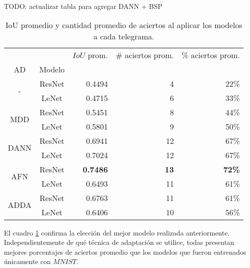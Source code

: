 TODO: actualizar tabla para agregar DANN + BSP
\begin{table}[H]
    \centering
    \begin{tabular}{cc|rrr}
        \toprule
                                 &        & $IoU$ prom.     & \# aciertos prom. & \% aciertos prom. \\
        AD                       & Modelo &                 &                   &                   \\
        \midrule
        \multirow[c]{2}{*}{-}    & ResNet & 0.4494          & 4                 & 22\%              \\
                                 & LeNet  & 0.4715          & 6                 & 33\%              \\\hline
        \multirow[c]{2}{*}{MDD}  & ResNet & 0.5451          & 8                 & 44\%              \\
                                 & LeNet  & 0.5801          & 9                 & 50\%              \\\hline
        \multirow[c]{2}{*}{DANN} & ResNet & 0.6941          & 12                & 67\%              \\
                                 & LeNet  & 0.7024          & 12                & 67\%              \\\hline
        \multirow[c]{2}{*}{AFN}  & ResNet & \textbf{0.7486} & \textbf{13}       & \textbf{72\%}     \\
                                 & LeNet  & 0.6493          & 11                & 61\%              \\\hline
        \multirow[c]{2}{*}{ADDA} & ResNet & 0.6763          & 11                & 61\%              \\
                                 & LeNet  & 0.6406          & 10                & 56\%              \\
        \bottomrule
    \end{tabular}
    \caption{IoU promedio y cantidad promedio de aciertos al aplicar los modelos a cada telegrama.}
    \label{tab:iou-cant-aciertos-en-telegramas}
\end{table}

El cuadro \ref{tab:iou-cant-aciertos-en-telegramas} confirma la elecci\'on del mejor modelo realizada anteriormente.
Independientemente de qu\'e t\'ecnica de adaptaci\'on se utilice, todas presentan mejores porcentajes de aciertos
promedio que los modelos que fueron entrenados \'unicamente con $MNIST$.


